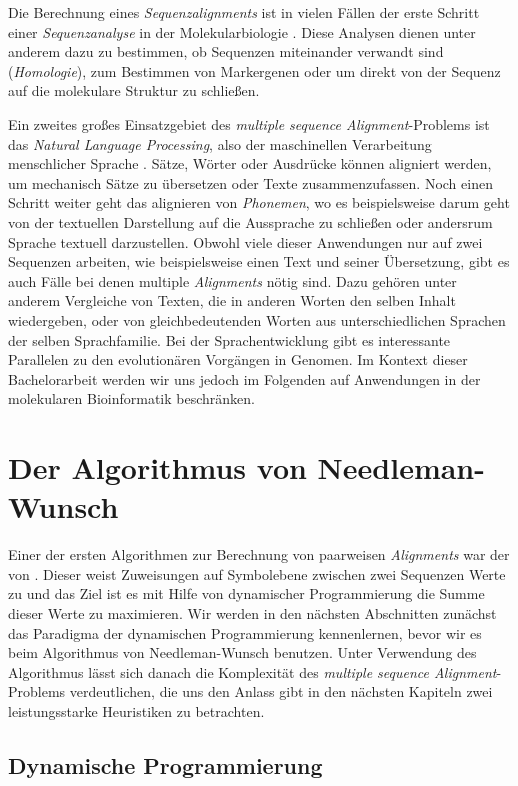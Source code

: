 Die Berechnung eines \emph{Sequenzalignments} ist in vielen Fällen der erste Schritt einer \emph{Sequenzanalyse} in der Molekularbiologie \cite{cpm10}. Diese Analysen dienen unter anderem dazu zu bestimmen, ob Sequenzen miteinander verwandt sind (\emph{Homologie}), zum Bestimmen von Markergenen oder um direkt von der Sequenz auf die molekulare Struktur zu schließen. 

Ein zweites großes Einsatzgebiet des \emph{multiple sequence Alignment}-Problems ist das \emph{Natural Language Processing}, also der maschinellen Verarbeitung menschlicher Sprache \citep{s10}. Sätze, Wörter oder Ausdrücke können aligniert werden, um mechanisch Sätze zu übersetzen oder Texte zusammenzufassen. Noch einen Schritt weiter geht das alignieren von \emph{Phonemen}, wo es beispielsweise darum geht von der textuellen Darstellung auf die Aussprache zu schließen oder andersrum Sprache textuell darzustellen. Obwohl viele dieser Anwendungen nur auf zwei Sequenzen arbeiten, wie beispielsweise einen Text und seiner Übersetzung, gibt es auch Fälle bei denen multiple \emph{Alignments} nötig sind. Dazu gehören unter anderem Vergleiche von Texten, die in anderen Worten den selben Inhalt wiedergeben, oder von gleichbedeutenden Worten aus unterschiedlichen Sprachen der selben Sprachfamilie. Bei der Sprachentwicklung gibt es interessante Parallelen zu den evolutionären Vorgängen in Genomen. Im Kontext dieser Bachelorarbeit werden wir uns jedoch im Folgenden auf Anwendungen in der molekularen Bioinformatik beschränken.  

\section{Der Algorithmus von Needleman-Wunsch}

Einer der ersten Algorithmen zur Berechnung von paarweisen \emph{Alignments} war der von \cite{nw70}. Dieser weist Zuweisungen auf Symbolebene zwischen zwei Sequenzen Werte zu und das Ziel ist es mit Hilfe von dynamischer Programmierung die Summe dieser Werte zu maximieren. Wir werden in den nächsten Abschnitten zunächst das Paradigma der dynamischen Programmierung kennenlernen, bevor wir es beim Algorithmus von Needleman-Wunsch benutzen. Unter Verwendung des Algorithmus lässt sich danach die Komplexität des \emph{multiple sequence Alignment}-Problems verdeutlichen, die uns den Anlass gibt in den nächsten Kapiteln zwei leistungsstarke Heuristiken zu betrachten.

\subsection{Dynamische Programmierung}

